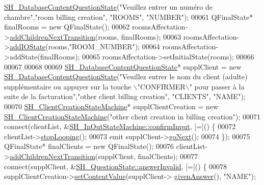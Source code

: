\begin{DoxyCode}
      \hyperlink{classSH__DatabaseContentQuestionState}{SH\_DatabaseContentQuestionState}(\textcolor{stringliteral}{"Veuillez entrer un numéro de chambre"},\textcolor{stringliteral}{"room
       billing creation"}, \textcolor{stringliteral}{"ROOMS"}, \textcolor{stringliteral}{"NUMBER"});
00061     QFinalState* finalRooms = \textcolor{keyword}{new} QFinalState();
00062     roomsAffectation->\hyperlink{classSH__LoopingInOutStateMachine_abfae9f47019379f270496de46845c729}{addChildrenNextTransition}(rooms, finalRooms);
00063     roomsAffectation->\hyperlink{classSH__InOutStateMachine_a2528cffddbe6f98c32ebef41423c0118}{addIOState}(rooms,\textcolor{stringliteral}{"ROOM\_NUMBER"});
00064     roomsAffectation->addState(finalRooms);
00065     roomsAffectation->setInitialState(rooms);
00066 
00067 
00068 
00069     \hyperlink{classSH__DatabaseContentQuestionState}{SH\_DatabaseContentQuestionState}* supplClient = \textcolor{keyword}{new} 
      \hyperlink{classSH__DatabaseContentQuestionState}{SH\_DatabaseContentQuestionState}(\textcolor{stringliteral}{"Veuillez entrer le nom du client (adulte)
       supplémentaire ou appuyer sur la touche \(\backslash\)"CONFIRMER\(\backslash\)" pour passer à la suite de la facturation"},\textcolor{stringliteral}{"other client
       billing creation"}, \textcolor{stringliteral}{"CLIENTS"}, \textcolor{stringliteral}{"NAME"});
00070     \hyperlink{classSH__ClientCreationStateMachine}{SH\_ClientCreationStateMachine}* supplClientCreation = \textcolor{keyword}{new} 
      \hyperlink{classSH__ClientCreationStateMachine}{SH\_ClientCreationStateMachine}(\textcolor{stringliteral}{"other client creation in billing creation"});
00071     connect(clientList, &\hyperlink{classSH__InOutStateMachine_a7f7d9c9300c1d05bce2c26029f28cc31}{SH\_InOutStateMachine::confirmInput}, [=]() \{
00072         clientList->\hyperlink{classSH__LoopingInOutStateMachine_a73d75e30318da22fec99387e9bf02a9b}{stopLooping}();
00073         emit supplClient->\hyperlink{classSH__GenericState_a34c1bebc765cc3a62d66c94c37d4f0c3}{goNext}();
00074     \});
00075     QFinalState* finalClients = \textcolor{keyword}{new} QFinalState();
00076     clientList->\hyperlink{classSH__LoopingInOutStateMachine_abfae9f47019379f270496de46845c729}{addChildrenNextTransition}(supplClient, finalClients);
00077     connect(supplClient, &\hyperlink{classSH__QuestionState_a3348a8a683130678ac87a10ba2a25486}{SH\_QuestionState::answerInvalid}, [=]() \{
00078         supplClientCreation->\hyperlink{classSH__InOutStateMachine_a9ab1534306b2bdb62743d4bcefe40c17}{setContentValue}(supplClient->
      \hyperlink{classSH__QuestionState_a29cdea8bc55e39e3ed02d24743c30f8c}{givenAnswer}(), \textcolor{stringliteral}{"NAME"});

\end{DoxyCode}
